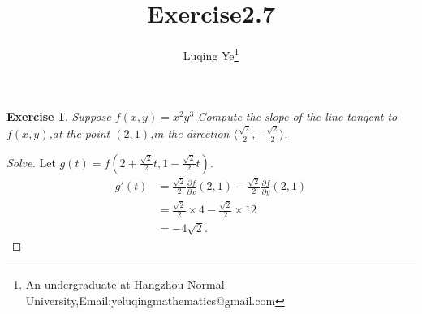 \documentclass{article}
\newtheorem*{exe}{Exercise}
\newenvironment{exercise}
{\bigskip\begin{mdframed}\begin{exe}}
    {\end{exe}\end{mdframed}\bigskip}
\newcommand{\pa}{\partial} \newcommand{\Om}{\Omega}
\begin{document}
\title{Exercise2.7}\author{Luqing Ye\footnote{An undergraduate at Hangzhou Normal University,Email:yeluqingmathematics@gmail.com}}
\maketitle\noindent
\begin{exercise}
  Suppose $f(x,y)=x^2y^3$.Compute the slope of the line tangent to
  $f(x,y)$,at the point $(2,1)$,in the direction $\langle \frac{\sqrt{2}}{2},-\frac{\sqrt{2}}{2}\rangle$.
\end{exercise}
\begin{proof}[Solve]
Let $g(t)=f(2+\frac{\sqrt{2}}{2}t,1-\frac{\sqrt{2}}{2}t)$.
\begin{align*}
  g'(t)&=\frac{\sqrt{2}}{2}\frac{\pa f}{\pa
    x}(2,1)-\frac{\sqrt{2}}{2}\frac{\pa f}{\pa y}(2,1)
\\&=\frac{\sqrt{2}}{2}\times 4-\frac{\sqrt{2}}{2}\times 12
\\&=-4 \sqrt{2}.
\end{align*}
\end{proof}





% 
% 
\end{document}
